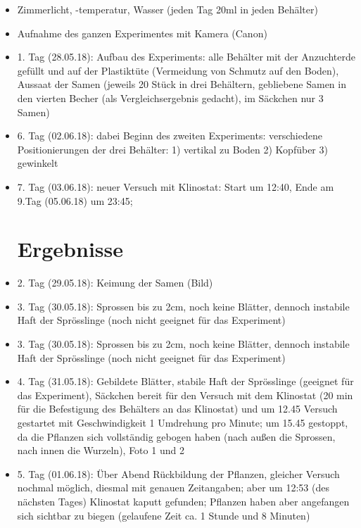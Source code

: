 \documentclass[
a4paper, 
11pt, 
ngerman,
listof=totoc,
bibliography=totocnumbered,
abstracton
]{scrreprt}
\begin{document}
\begin{itemize}
	
	\item Zimmerlicht, -temperatur, Wasser (jeden Tag 20ml in jeden Behälter)
	
	\item Aufnahme des ganzen Experimentes mit Kamera (Canon)
	
	\item 1. Tag (28.05.18): Aufbau des Experiments: alle Behälter mit der Anzuchterde gefüllt und auf der Plastiktüte (Vermeidung von Schmutz auf den Boden), Aussaat der Samen (jeweils 20 Stück in drei Behältern, gebliebene Samen in den vierten Becher (als Vergleichsergebnis gedacht), im Säckchen nur 3 Samen)
	  
	\item 6. Tag (02.06.18): dabei Beginn des zweiten Experiments: verschiedene Positionierungen der drei Behälter: 1) vertikal zu Boden 2) Kopfüber 3) gewinkelt 
	
	\item 7. Tag (03.06.18): neuer Versuch mit Klinostat: Start um 12:40, Ende am 9.Tag (05.06.18) um 23:45; 

\section{Ergebnisse}

\item 2. Tag (29.05.18): Keimung der Samen (Bild)

\item 3. Tag (30.05.18): Sprossen bis zu 2cm, noch keine Blätter, dennoch instabile Haft der Sprösslinge (noch nicht geeignet für das Experiment) 

\item 3. Tag (30.05.18): Sprossen bis zu 2cm, noch keine Blätter, dennoch instabile Haft der Sprösslinge (noch nicht geeignet für das Experiment)

\item 4. Tag (31.05.18): Gebildete Blätter, stabile Haft der Sprösslinge (geeignet für das Experiment), Säckchen bereit für den Versuch mit dem Klinostat (20 min für die Befestigung des Behälters an das Klinostat) und um 12.45 Versuch gestartet mit Geschwindigkeit 1 Umdrehung pro Minute;
um 15.45 gestoppt, da die Pflanzen sich vollständig gebogen haben (nach außen die Sprossen, nach innen die Wurzeln), Foto 1 und 2

\item 5. Tag (01.06.18): Über Abend Rückbildung der Pflanzen, gleicher Versuch nochmal möglich, diesmal mit genauen Zeitangaben; aber um 12:53 (des nächsten Tages) Klinostat kaputt gefunden; Pflanzen haben aber angefangen sich sichtbar zu biegen (gelaufene Zeit ca. 1 Stunde und 8 Minuten)


\end{itemize}
\end{document}
